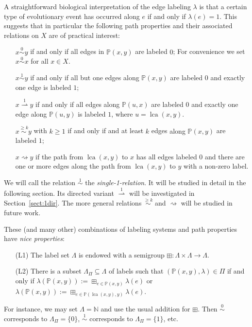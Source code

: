 \documentclass[smallextended]{svjour3}
\newcommand{\rev}[1]{\begingroup\color{blue}#1\endgroup}
\newcommand{\Ro}{\mathrel{\overset{0}{\sim}}}
\newcommand{\Rl}{\mathrel{\overset{1}{\sim}}}
\newcommand{\Rk}{\mathrel{\overset{\ge k}{\sim}}}
\newcommand{\Rld}{\mathrel{\overset{1}{\rightharpoonup}}}
\newcommand{\Rd}{\mathrel{\rightsquigarrow}}
\newcommand{\lca}[1]{\mathop{lca}(#1)}
\begin{document}
A straightforward biological interpretation of the edge labeling $\lambda$
is that a certain type of evolutionary event has occurred along $e$ if and
only if $\lambda(e)=1$. This suggests that in particular the following path
properties and their associated relations on $X$ are of practical interest:
\begin{itemize}
\item[{$x \Ro y$}] if and only if all edges in $\mathbb{P}(x,y)$ are
  labeled $0$; For convenience we set $x \Ro x$ for all $x\in X$.
\item[{$x \Rl y$}] if and only if all but one edges along $\mathbb{P}(x,y)$
  are labeled $0$ and exactly one edge is labeled $1$;
\item[{$x \Rld y$}] if and only if all edges along $\mathbb{P}(u,x)$ are 
  labeled $0$ and exactly one edge along $\mathbb{P}(u,y)$ is labeled $1$,
  where $u=\lca{x,y}$. 
\item[{$x \Rk y$}] with \rev{$k\geq1$} if and only if and at least $k$ edges \rev{along $\mathbb{P}(x,y)$}
	are 
  labeled $1$;
\item[{$x \Rd y$}] if the path from $\lca{x,y}$ to $x$ has all edges
  labeled $0$ and there are one or more edges along the path from
  $\lca{x,y}$ to $y$ with a non-zero label. 
\end{itemize}
We will call the relation $\Rl$ the \emph{single-1-relation}. It will be
studied in detail in the following section. Its directed variant $\Rld$
will be investigated in Section~\ref{sect:1dir}. The more general relations
$\Rk$ and $\Rd$ will be studied \rev{in future work.} %

These (and many other) combinations of labeling systems and path properties
have \emph{nice properties}:
\begin{itemize}
\item[(L1)] The label set $\Lambda$ is endowed with a semigroup $\boxplus:
  \Lambda\times\Lambda\to\Lambda$.
\item[(L2)] There is a subset $\Lambda_{\Pi}\subseteq\Lambda$ of labels
  such that $(\mathbb{P}(x,y),\lambda) \in \Pi$ if and only if
  $\lambda(\mathbb{P}(x,y)):=\boxplus_{e\in\mathbb{P}(x,y)}\lambda(e)$ or 
  $\lambda(\mathbb{P}(x,y)):=\boxplus_{e\in\mathbb{P}(\lca{x,y},y)}\lambda(e)$.
\end{itemize}
For instance, we may set $\Lambda=\mathbb{N}$ and use the usual addition
for $\boxplus$. Then $\Ro$ corresponds to $\Lambda_{\Pi}=\{0\}$, $\Rl$
corresponds to $\Lambda_{\Pi}=\{1\}$, etc.
\end{document}

